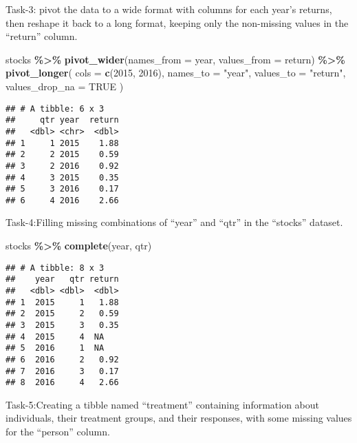 \documentclass[
]{article}
\newenvironment{Shaded}{\begin{snugshade}}{\end{snugshade}}
\newcommand{\AttributeTok}[1]{\textcolor[rgb]{0.13,0.29,0.53}{#1}}
\newcommand{\ConstantTok}[1]{\textcolor[rgb]{0.56,0.35,0.01}{#1}}
\newcommand{\FunctionTok}[1]{\textcolor[rgb]{0.13,0.29,0.53}{\textbf{#1}}}
\newcommand{\NormalTok}[1]{#1}
\newcommand{\SpecialCharTok}[1]{\textcolor[rgb]{0.81,0.36,0.00}{\textbf{#1}}}
\newcommand{\StringTok}[1]{\textcolor[rgb]{0.31,0.60,0.02}{#1}}
\begin{document}
Task-3: pivot the data to a wide format with columns for each year's
returns, then reshape it back to a long format, keeping only the
non-missing values in the ``return'' column.

\begin{Shaded}
\begin{Highlighting}[]
\NormalTok{stocks }\SpecialCharTok{\%\textgreater{}\%} 
  \FunctionTok{pivot\_wider}\NormalTok{(}\AttributeTok{names\_from =}\NormalTok{ year, }\AttributeTok{values\_from =}\NormalTok{ return) }\SpecialCharTok{\%\textgreater{}\%} 
  \FunctionTok{pivot\_longer}\NormalTok{(}
    \AttributeTok{cols =} \FunctionTok{c}\NormalTok{(}\StringTok{\textasciigrave{}}\AttributeTok{2015}\StringTok{\textasciigrave{}}\NormalTok{, }\StringTok{\textasciigrave{}}\AttributeTok{2016}\StringTok{\textasciigrave{}}\NormalTok{), }
    \AttributeTok{names\_to =} \StringTok{"year"}\NormalTok{, }
    \AttributeTok{values\_to =} \StringTok{"return"}\NormalTok{, }
    \AttributeTok{values\_drop\_na =} \ConstantTok{TRUE}
\NormalTok{  )}
\end{Highlighting}
\end{Shaded}

\begin{verbatim}
## # A tibble: 6 x 3
##     qtr year  return
##   <dbl> <chr>  <dbl>
## 1     1 2015    1.88
## 2     2 2015    0.59
## 3     2 2016    0.92
## 4     3 2015    0.35
## 5     3 2016    0.17
## 6     4 2016    2.66
\end{verbatim}

Task-4:Filling missing combinations of ``year'' and ``qtr'' in the
``stocks'' dataset.

\begin{Shaded}
\begin{Highlighting}[]
\NormalTok{stocks }\SpecialCharTok{\%\textgreater{}\%} 
  \FunctionTok{complete}\NormalTok{(year, qtr)}
\end{Highlighting}
\end{Shaded}

\begin{verbatim}
## # A tibble: 8 x 3
##    year   qtr return
##   <dbl> <dbl>  <dbl>
## 1  2015     1   1.88
## 2  2015     2   0.59
## 3  2015     3   0.35
## 4  2015     4  NA   
## 5  2016     1  NA   
## 6  2016     2   0.92
## 7  2016     3   0.17
## 8  2016     4   2.66
\end{verbatim}

Task-5:Creating a tibble named ``treatment'' containing information
about individuals, their treatment groups, and their responses, with
some missing values for the ``person'' column.
\end{document}
